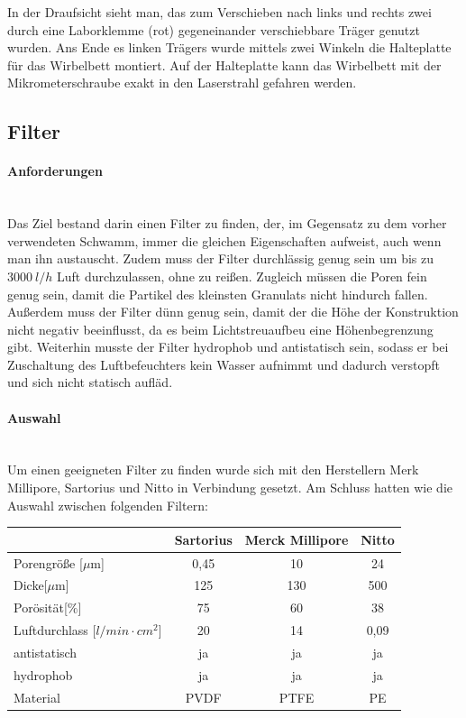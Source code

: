 In der Draufsicht sieht man, das zum Verschieben nach links und rechts zwei durch eine Laborklemme (rot) gegeneinander verschiebbare Träger genutzt wurden. Ans Ende es linken Trägers wurde mittels zwei Winkeln die Halteplatte für das Wirbelbett montiert. Auf der Halteplatte kann das Wirbelbett mit der Mikrometerschraube exakt in den Laserstrahl gefahren werden.





\subsection{Filter}

\paragraph{Anforderungen}
\hfill \\
Das Ziel bestand darin einen Filter zu finden, der, im Gegensatz zu dem vorher verwendeten Schwamm, immer die gleichen Eigenschaften aufweist, auch wenn man ihn austauscht. Zudem muss der Filter durchlässig genug sein um bis zu $\SI{3000}{l/h}$ Luft durchzulassen, ohne zu reißen. Zugleich müssen die Poren fein genug sein, damit die Partikel des kleinsten Granulats nicht hindurch fallen. Außerdem muss der Filter dünn genug sein, damit der die Höhe der Konstruktion nicht negativ beeinflusst, da es beim Lichtstreuaufbeu eine Höhenbegrenzung gibt. Weiterhin musste der Filter hydrophob und antistatisch sein, sodass er bei Zuschaltung des Luftbefeuchters kein Wasser aufnimmt und dadurch verstopft und sich nicht statisch aufläd.


\paragraph{Auswahl}
\hfill \\
Um einen geeigneten Filter zu finden wurde sich mit den Herstellern Merk Millipore, Sartorius und Nitto in Verbindung gesetzt. Am Schluss hatten wie die Auswahl zwischen folgenden Filtern:


\begin{center}
			\begin{tabular}{l|c|c|c}
				& Sartorius & Merck Millipore & Nitto \\
				\hline
				Porengröße [$\mu$m] & 0,45  & 10    & 24 \\
				Dicke[$\mu$m] & 125 & 130 & 500 \\
				Porösität[$\%$] & 75    & 60    & 38 \\
				Luftdurchlass [$l/min \cdot cm^2$] & 20    & 14    & 0,09 \\
				antistatisch & ja    & ja    & ja \\
				hydrophob & ja    & ja    & ja \\
				Material & PVDF\footnotemark[1]  & PTFE\footnotemark[2]  & PE\footnotemark[3] \\
			\end{tabular}	
\end{center}

